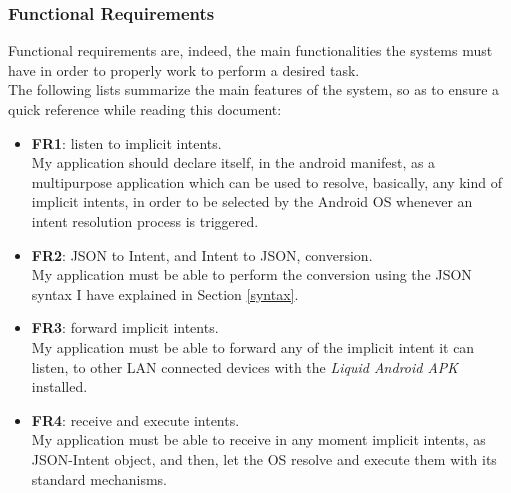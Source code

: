 \subsubsection{Functional Requirements}
Functional requirements are, indeed, the main functionalities the systems must have in order to properly work to perform a desired task.\\
The following lists summarize the main features of the system, so as to ensure a quick reference while reading this document:
\begin{itemize}
	\item \textbf{FR1}: listen to implicit intents.\\My application should declare itself, in the android manifest, as a multipurpose application which can be used to resolve, basically, any kind of implicit intents, in order to be selected by the Android OS whenever an intent resolution process is triggered.
	\item \textbf{FR2}: JSON to Intent, and Intent to JSON, conversion.\\ My application must be able to perform the conversion using the JSON syntax I have explained in Section \ref{syntax}.
	\item \textbf{FR3}: forward implicit intents.\\ My application must be able to forward any of the implicit intent it can listen, to other LAN connected devices with the \textit{Liquid Android APK} installed.
	\item \textbf{FR4}: receive and execute intents.\\ My application must be able to receive in any moment implicit intents, as JSON-Intent object, and then, let the OS resolve and execute them with its standard mechanisms.
\end{itemize}

